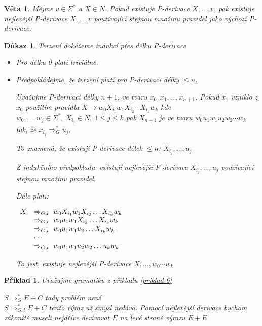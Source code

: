 \documentclass[10pt, a4paper, titlepage]{article}
\theoremstyle{note}
\newtheorem{veta}{\textbf{Věta}}
\newtheorem{dukaz}{\textbf{Důkaz}}
\newtheorem{priklad}{\textbf{Příklad}}
\begin{document}
\begin{veta}
Mějme $v \in \Sigma^*$ a $X \in N$. Pokud existuje P-derivace $X,\ldots,v$, pak existuje nejlevější P-derivace $X,\ldots,v$ používající stejnou množinu pravidel jako výchozí P-derivace.
\end{veta}
\begin{dukaz}
Tvrzení dokážeme indukcí přes délku P-derivace
\begin{itemize}
\item
Pro délku 0 platí triviálně.
\item
Předpokládejme, že tvrzení platí pro P-derivaci délky $\le n$.

Uvažujme P-derivaci délky $n+1$, ve tvaru $x_0,x_1,\ldots,x_{n+1}$. Pokud $x_1$ vzniklo z $x_0$ použitím pravidla $X \rightarrow w_0X_{i_1}w_1X_{i_2} \cdots X_{i_k}w_k$ kde $w_0,\ldots,w_j \in \Sigma^*,\ X_{i_j} \in N,\ 1 \le j\le k$ pak $X_{n+1}$ je ve tvaru $w_0u_1w_1u_2w_2 \cdots w_k$ tak, že $x_{i_j} \Rightarrow_G^* u_j$.

To znamená, že existují P-derivace délek $\le n$: $X_{i_j},\ldots,u_j$

Z indukčního předpokladu: existují nejlevější P-derivace $X_{i_j},\ldots,u_j$ používající stejnou množinu pravidel.

Dále platí: 

$
\begin{array}{l l}
X & \Rightarrow_{G,l}\  w_0X_{i_1}w_1X_{i_2} \ldots X_{i_k}w_k \\
& \Rightarrow_{G,l}\  w_0u_1w_1X_{i_2} \ldots X_{i_k}w_k \\
& \Rightarrow_{G,l}\  w_0u_1w_1u_2 \ldots X_{i_k}w_k \\
& \cdots \\
& \Rightarrow_{G,l}\  w_0u_1w_1u_2w_2 \ldots u_kw_k
\end{array}
$

To jest, existuje nejlevější P-derivace $X,\ldots,w_0 \cdots w_k$
\end{itemize}
\end{dukaz}

\begin{priklad}
Uvažujme gramatiku z příkladu \ref{priklad-6}

$S \Rightarrow_G^* E+C$ tady problém není\\
$S \Rightarrow_{G,l}^* E+C$ tento výraz už smysl nedává. Pomocí nejlevější derivace bychom zákonitě museli nejdříve derivovat $E$ na levé straně výrazu $E+E$
\end{priklad}
\end{document}
